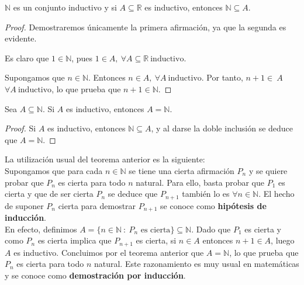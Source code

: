 \begin{teo}
    $\mathbb{N}$ es un conjunto inductivo y si $A \subseteq \mathbb{R}$ es inductivo, entonces $\mathbb{N} \subseteq A$.
\end{teo}
\begin{proof}
    Demostraremos únicamente la primera afirmación, ya que la segunda es evidente.
    
    Es claro que $1 \in \mathbb{N}$, pues $1 \in A, ~\forall A \subseteq \mathbb{R} ~\text{inductivo}$.
    
    Supongamos que $n \in \mathbb{N}$. Entonces $n \in A, ~\forall A ~\text{inductivo}$. Por tanto,
    $n+1 \in~A$ $\forall A ~\text{inductivo}$, lo que prueba que $n+1 \in \mathbb{N}$.
\end{proof}

\begin{teo}
    Sea $A \subseteq \mathbb{N}$. Si $A$ es inductivo, entonces $A = \mathbb{N}$.
\end{teo}
\begin{proof}
    Si $A$ es inductivo, entonces $\mathbb{N} \subseteq A$, y al darse la doble inclusión se deduce que $A = \mathbb{N}$.
\end{proof}

\vspace{0.5cm}
La utilización usual del teorema anterior es la siguiente:\\

Supongamos que para cada $n \in \mathbb{N}$ se tiene una cierta afirmación $P_n$ y se quiere probar que
$P_n$ es cierta para todo $n$ natural. Para ello, basta probar que $P_1$ es cierta y que de ser cierta
$P_n$ se deduce que $P_{n+1}$ también lo es $\forall n \in \mathbb{N}$. El hecho de suponer
$P_n$ cierta para demostrar $P_{n+1}$ se conoce como \textbf{hipótesis de inducción}.\\

En efecto, definimos $A = \{n \in \mathbb{N} ~:~\text{$P_n$ es cierta}\} \subseteq \mathbb{N}$. Dado que $P_1$ es cierta y como
$P_n$ es cierta implica que $P_{n+1}$ es cierta, si $n \in A$ entonces $n+1 \in A$, luego $A$
es inductivo. Concluimos por el teorema anterior que $A = \mathbb{N}$, lo que prueba que $P_n$ es cierta para todo $n$
natural. Este razonamiento es muy usual en matemáticas y se conoce como \textbf{demostración por inducción}.

